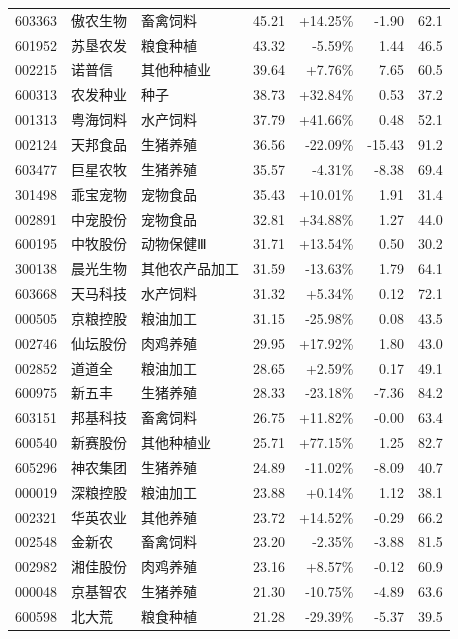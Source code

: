\begin{longtable}{@{}llp{2.4cm}rrrr@{}}
603363 & 傲农生物 & 畜禽饲料 & 45.21 & +14.25\% & -1.90 & 62.1 \\
601952 & 苏垦农发 & 粮食种植 & 43.32 & -5.59\% & 1.44 & 46.5 \\
002215 & 诺普信 & 其他种植业 & 39.64 & +7.76\% & 7.65 & 60.5 \\
600313 & 农发种业 & 种子 & 38.73 & +32.84\% & 0.53 & 37.2 \\
001313 & 粤海饲料 & 水产饲料 & 37.79 & +41.66\% & 0.48 & 52.1 \\
002124 & 天邦食品 & 生猪养殖 & 36.56 & -22.09\% & -15.43 & 91.2 \\
603477 & 巨星农牧 & 生猪养殖 & 35.57 & -4.31\% & -8.38 & 69.4 \\
301498 & 乖宝宠物 & 宠物食品 & 35.43 & +10.01\% & 1.91 & 31.4 \\
002891 & 中宠股份 & 宠物食品 & 32.81 & +34.88\% & 1.27 & 44.0 \\
600195 & 中牧股份 & 动物保健Ⅲ & 31.71 & +13.54\% & 0.50 & 30.2 \\
300138 & 晨光生物 & 其他农产品加工 & 31.59 & -13.63\% & 1.79 & 64.1 \\
603668 & 天马科技 & 水产饲料 & 31.32 & +5.34\% & 0.12 & 72.1 \\
000505 & 京粮控股 & 粮油加工 & 31.15 & -25.98\% & 0.08 & 43.5 \\
002746 & 仙坛股份 & 肉鸡养殖 & 29.95 & +17.92\% & 1.80 & 43.0 \\
002852 & 道道全 & 粮油加工 & 28.65 & +2.59\% & 0.17 & 49.1 \\
600975 & 新五丰 & 生猪养殖 & 28.33 & -23.18\% & -7.36 & 84.2 \\
603151 & 邦基科技 & 畜禽饲料 & 26.75 & +11.82\% & -0.00 & 63.4 \\
600540 & 新赛股份 & 其他种植业 & 25.71 & +77.15\% & 1.25 & 82.7 \\
605296 & 神农集团 & 生猪养殖 & 24.89 & -11.02\% & -8.09 & 40.7 \\
000019 & 深粮控股 & 粮油加工 & 23.88 & +0.14\% & 1.12 & 38.1 \\
002321 & 华英农业 & 其他养殖 & 23.72 & +14.52\% & -0.29 & 66.2 \\
002548 & 金新农 & 畜禽饲料 & 23.20 & -2.35\% & -3.88 & 81.5 \\
002982 & 湘佳股份 & 肉鸡养殖 & 23.16 & +8.57\% & -0.12 & 60.9 \\
000048 & 京基智农 & 生猪养殖 & 21.30 & -10.75\% & -4.89 & 63.6 \\
600598 & 北大荒 & 粮食种植 & 21.28 & -29.39\% & -5.37 & 39.5 \\

\end{longtable}
